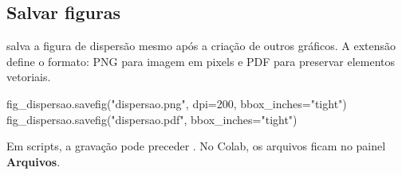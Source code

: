 \subsection{Salvar figuras}

 salva a figura de dispersão mesmo após a criação de outros gráficos. A extensão define o formato: PNG para imagem em pixels e PDF para preservar elementos vetoriais.

\begin{exemplo}
fig_dispersao.savefig("dispersao.png", dpi=200, bbox_inches="tight")
fig_dispersao.savefig("dispersao.pdf", bbox_inches="tight")
\end{exemplo}

Em scripts, a gravação pode preceder . No Colab, os arquivos ficam no painel \textbf{Arquivos}.
